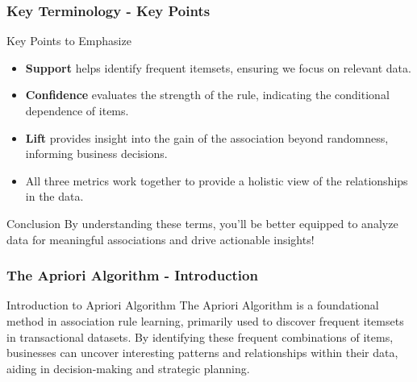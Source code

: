 \documentclass{beamer}
\begin{document}
\begin{frame}[fragile]
    \frametitle{Key Terminology - Key Points}
    \begin{block}{Key Points to Emphasize}
        \begin{itemize}
            \item \textbf{Support} helps identify frequent itemsets, ensuring we focus on relevant data.
            \item \textbf{Confidence} evaluates the strength of the rule, indicating the conditional dependence of items.
            \item \textbf{Lift} provides insight into the gain of the association beyond randomness, informing business decisions.
            \item All three metrics work together to provide a holistic view of the relationships in the data.
        \end{itemize}
    \end{block}

    \begin{block}{Conclusion}
        By understanding these terms, you’ll be better equipped to analyze data for meaningful associations and drive actionable insights!
    \end{block}
\end{frame}

\begin{frame}[fragile]
    \frametitle{The Apriori Algorithm - Introduction}
    \begin{block}{Introduction to Apriori Algorithm}
        The Apriori Algorithm is a foundational method in association rule learning, primarily used to discover frequent itemsets in transactional datasets. By identifying these frequent combinations of items, businesses can uncover interesting patterns and relationships within their data, aiding in decision-making and strategic planning.
    \end{block}
\end{frame}
\end{document}
